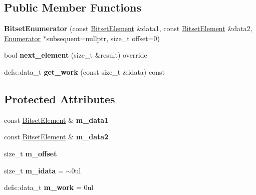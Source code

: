 \subsection*{Public Member Functions}
\begin{DoxyCompactItemize}
\item 
{\bfseries Bitset\+Enumerator} (const \hyperlink{classBitsetElement}{Bitset\+Element} \&data1, const \hyperlink{classBitsetElement}{Bitset\+Element} \&data2, \hyperlink{classEnumerator}{Enumerator} $\ast$subsequent=nullptr, size\+\_\+t offset=0)\hypertarget{classBitsetEnumerator_a4c5297e92189eb2db688d5ae95aa074c}{}\label{classBitsetEnumerator_a4c5297e92189eb2db688d5ae95aa074c}

\item 
bool {\bfseries next\+\_\+element} (size\+\_\+t \&result) override\hypertarget{classBitsetEnumerator_a4b39060663550c127c5aa238865c94c4}{}\label{classBitsetEnumerator_a4b39060663550c127c5aa238865c94c4}

\item 
defs\+::data\+\_\+t {\bfseries get\+\_\+work} (const size\+\_\+t \&idata) const \hypertarget{classBitsetEnumerator_a940e791dcd9aaccdcaf5d29253a39016}{}\label{classBitsetEnumerator_a940e791dcd9aaccdcaf5d29253a39016}

\end{DoxyCompactItemize}
\subsection*{Protected Attributes}
\begin{DoxyCompactItemize}
\item 
const \hyperlink{classBitsetElement}{Bitset\+Element} \& {\bfseries m\+\_\+data1}\hypertarget{classBitsetEnumerator_a7a9c33fce104b03ad93e982e84043de7}{}\label{classBitsetEnumerator_a7a9c33fce104b03ad93e982e84043de7}

\item 
const \hyperlink{classBitsetElement}{Bitset\+Element} \& {\bfseries m\+\_\+data2}\hypertarget{classBitsetEnumerator_aae1ee3784204f62f1759bf681ee28a4f}{}\label{classBitsetEnumerator_aae1ee3784204f62f1759bf681ee28a4f}

\item 
size\+\_\+t {\bfseries m\+\_\+offset}\hypertarget{classBitsetEnumerator_a5b51d281c1d7e85a4f102a9ed85528ae}{}\label{classBitsetEnumerator_a5b51d281c1d7e85a4f102a9ed85528ae}

\item 
size\+\_\+t {\bfseries m\+\_\+idata} = $\sim$0ul\hypertarget{classBitsetEnumerator_a45e95ec5fc9a2d27c63023947d501092}{}\label{classBitsetEnumerator_a45e95ec5fc9a2d27c63023947d501092}

\item 
defs\+::data\+\_\+t {\bfseries m\+\_\+work} = 0ul\hypertarget{classBitsetEnumerator_a3b3e4114e11171be5bc918362ecda275}{}\label{classBitsetEnumerator_a3b3e4114e11171be5bc918362ecda275}

\end{DoxyCompactItemize}
